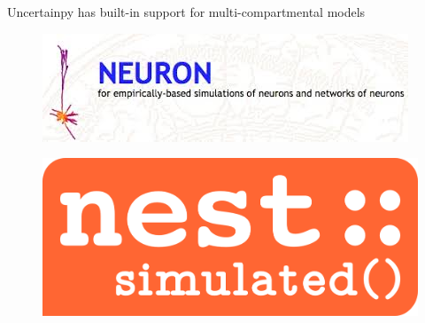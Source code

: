 \documentclass[presentation]{beamer}
\begin{document}












\begin{frame}[fragile]{Uncertainpy has built-in support for multi-compartmental models
  }
  \vspace{-2mm}

  \begin{figure}
    \includegraphics[height=0.3\textheight]{neuron.jpeg}
  \end{figure}
  \pause
  \begin{figure}
    \includegraphics[height=0.25\textheight]{nest.png}
  \end{figure}

\end{frame}






\end{document}
